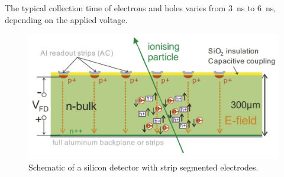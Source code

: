The typical collection time of electrons and holes varies from 3~ns to 6~ns, depending on the applied voltage.
\begin{figure}[H]
	\centering
	\includegraphics[width=0.7\linewidth]{IMG/ch1/Detector.PNG}
	\caption{Schematic of a silicon detector with strip segmented electrodes\cite{detector}.}
	\label{fig:detector}
\end{figure}
